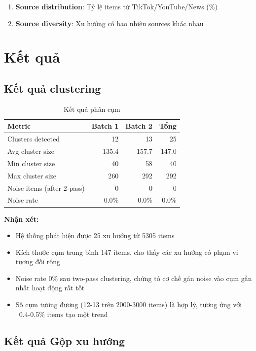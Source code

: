 \begin{enumerate}
    \item \textbf{Source distribution}: Tỷ lệ items từ TikTok/YouTube/News (\%)
    \item \textbf{Source diversity}: Xu hướng có bao nhiêu sources khác nhau
\end{enumerate}

\section{Kết quả}

\subsection{Kết quả clustering}

\begin{table}[H]
    \centering
    \begin{tabular}{|l|r|r|r|}
    \hline
    \textbf{Metric} & \textbf{Batch 1} & \textbf{Batch 2} & \textbf{Tổng} \\
    \hline
    Clusters detected & 12 & 13 & 25 \\
    Avg cluster size & 135.4 & 157.7 & 147.0 \\
    Min cluster size & 40 & 58 & 40 \\
    Max cluster size & 260 & 292 & 292 \\
    Noise items (after 2-pass) & 0 & 0 & 0 \\
    Noise rate & 0.0\% & 0.0\% & 0.0\% \\
    \hline
    \end{tabular}
    \caption{Kết quả phân cụm}
    \label{table:clustering_results}
\end{table}

\textbf{Nhận xét:}
\begin{itemize}
    \item Hệ thống phát hiện được 25 xu hướng từ 5305 items
    \item Kích thước cụm trung bình 147 items, cho thấy các xu hướng có phạm vi tương đối rộng
    \item Noise rate 0\% sau two-pass clustering, chứng tỏ cơ chế gán noise vào cụm gần nhất hoạt động rất tốt
    \item Số cụm tương đương (12-13 trên 2000-3000 items) là hợp lý, tương ứng với ~0.4-0.5\% items tạo một trend
\end{itemize}

\subsection{Kết quả Gộp xu hướng}

